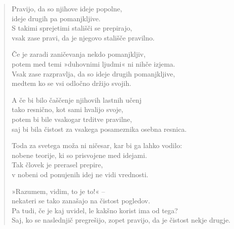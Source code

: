 \clearpage
\begin{verse}

Pravijo, da so njihove ideje popolne,\\
ideje drugih pa pomanjkljive.\\
S takimi sprejetimi stališči se prepirajo,\\
vsak zase pravi, da je njegovo stališče pravilno.

Če je zaradi zaničevanja nekdo pomanjkljiv,\\
potem med temi »duhovnimi ljudmi« ni nihče izjema.\\
Vsak zase razpravlja, da so ideje drugih pomanjkljive,\\
medtem ko se vsi odločno držijo svojih.

A če bi bilo čaščenje njihovih lastnih učenj\\
tako resnično, kot sami hvalijo svoje,\\
potem bi bile vsakogar trditve pravilne,\\
saj bi bila čistost za vsakega posameznika osebna resnica.

Toda za svetega moža ni ničesar, kar bi ga lahko vodilo:\\
nobene teorije, ki so prisvojene med idejami.\\
Tak človek je prerasel prepire,\\
v nobeni od ponujenih idej ne vidi vrednosti.

»Razumem, vidim, to je to!« --\\
nekateri se tako zanašajo na čistost pogledov.\\
Pa tudi, če je kaj uvidel, le kakšno korist ima od tega?\\
Saj, ko se naslednjič pregrešijo, zopet pravijo, da je čistost nekje drugje.

\end{verse}


